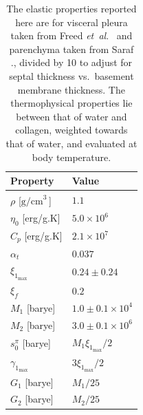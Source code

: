 \begin{table}
    \centering
    \begin{tabular}{|l|l|}
        \hline
        Property & Value \\ \hline
        $\rho$ \hfill [$\textrm{g/cm}^{3^{\phantom{|}}}$] & $1.1$ \\
        $\eta_0$ \hfill [erg/g.K] & $5.0 \times 10^6$ \\
        $C_p$ \hfill [erg/g.K] & $2.1 \times 10^7$ \\
        $\alpha_t$ & $0.037$ \\ \hline
        $\xi_{1_{\max}}$ & $0.24 \pm 0.24$ \\
        $\xi_f$ & $0.2$ \\
        $M_1$ \hfill [barye] & $1.0 \pm 0.1 \times 10^4$ \\
        $M_2$ \hfill [barye] & $3.0 \pm 0.1 \times 10^6$ \\
        $s^{\pi}_0$ \hfill [barye] & $M_1 \xi_{1_{\max}} / 2$ \\ \hline
        $\gamma_{1_{\max}}$ & $3 \xi_{1_{\max}} / 2$ \\
        $G_1$ \hfill [barye] & $M_1 / 25$ \\
        $G_2$ \hfill [barye] & $M_2 / 25$ \\ \hline
    \end{tabular}
    \caption{The elastic properties reported here are for visceral pleura taken from Freed \textit{et~al}.\ \cite{Freedetal17} and parenchyma taken from Saraf ., \cite{Sarafetal07} divided by 10 to adjust for septal thickness vs.\ basement membrane thickness.  The thermo\-physical properties lie between that of water and collagen, weighted towards that of water, and evaluated at body temperature.}
    \label{tableVisceralPleura}
\end{table}

